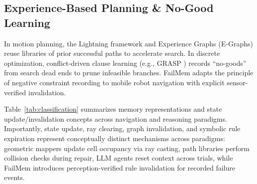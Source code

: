 \subsection{Experience-Based Planning \& No-Good Learning}
In motion planning, the Lightning framework \cite{berenson2012lightning} and Experience Graphs (E-Graphs) \cite{phillips2012egraphs} reuse libraries of prior successful paths to accelerate search. In discrete optimization, conflict-driven clause learning (e.g., GRASP \cite{marquessilva1999grasp}) records ``no-goods'' from search dead ends to prune infeasible branches. FailMem adapts the principle of negative constraint recording to mobile robot navigation with explicit sensor-verified invalidation.

Table~\ref{tab:classification} summarizes memory representations and state update/invalidation concepts across navigation and reasoning paradigms. Importantly, state update, ray clearing, graph invalidation, and symbolic rule expiration represent conceptually distinct mechanisms across paradigms: geometric mappers update cell occupancy via ray casting, path libraries perform collision checks during repair, LLM agents reset context across trials, while FailMem introduces perception-verified rule invalidation for recorded failure events.


